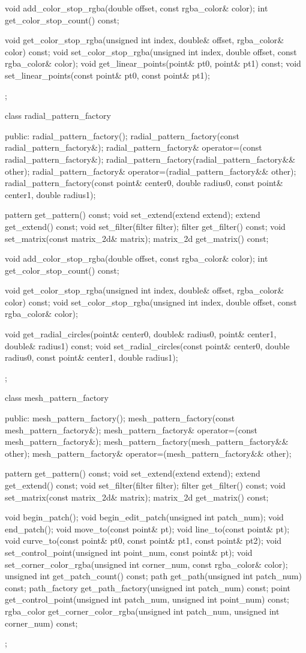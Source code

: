 \begin{codeblock}
{{{{{    void add_color_stop_rgba(double offset, const rgba_color& color);
    int get_color_stop_count() const;

    void get_color_stop_rgba(unsigned int index, double& offset, rgba_color& 
    color) const;
    void set_color_stop_rgba(unsigned int index, double offset, const 
    rgba_color& color);
    void get_linear_points(point& pt0, point& pt1) const;
    void set_linear_points(const point& pt0, const point& pt1);
  };

  class radial_pattern_factory {
  public:
    radial_pattern_factory();
    radial_pattern_factory(const radial_pattern_factory&);
    radial_pattern_factory& operator=(const radial_pattern_factory&);
    radial_pattern_factory(radial_pattern_factory&& other);
    radial_pattern_factory& operator=(radial_pattern_factory&& other);
    radial_pattern_factory(const point& center0, double radius0, const point& 
    center1, double radius1);

    pattern get_pattern() const;
    void set_extend(extend extend);
    extend get_extend() const;
    void set_filter(filter filter);
    filter get_filter() const;
    void set_matrix(const matrix_2d& matrix);
    matrix_2d get_matrix() const;

    void add_color_stop_rgba(double offset, const rgba_color& color);
    int get_color_stop_count() const;

    void get_color_stop_rgba(unsigned int index, double& offset, rgba_color& 
    color) const;
    void set_color_stop_rgba(unsigned int index, double offset, const 
    rgba_color& color);

    void get_radial_circles(point& center0, double& radius0, point& center1, 
    double& radius1) const;
    void set_radial_circles(const point& center0, double radius0, const point& 
    center1, double radius1);
  };

  class mesh_pattern_factory {
  public:
    mesh_pattern_factory();
    mesh_pattern_factory(const mesh_pattern_factory&);
    mesh_pattern_factory& operator=(const mesh_pattern_factory&);
    mesh_pattern_factory(mesh_pattern_factory&& other);
    mesh_pattern_factory& operator=(mesh_pattern_factory&& other);

    pattern get_pattern() const;
    void set_extend(extend extend);
    extend get_extend() const;
    void set_filter(filter filter);
    filter get_filter() const;
    void set_matrix(const matrix_2d& matrix);
    matrix_2d get_matrix() const;

    void begin_patch();
    void begin_edit_patch(unsigned int patch_num);
    void end_patch();
    void move_to(const point& pt);
    void line_to(const point& pt);
    void curve_to(const point& pt0, const point& pt1, const point& pt2);
    void set_control_point(unsigned int point_num, const point& pt);
    void set_corner_color_rgba(unsigned int corner_num, const rgba_color& 
    color);
    unsigned int get_patch_count() const;
    path get_path(unsigned int patch_num) const;
    path_factory get_path_factory(unsigned int patch_num) const;
    point get_control_point(unsigned int patch_num, unsigned int point_num) 
    const;
    rgba_color get_corner_color_rgba(unsigned int patch_num, unsigned int 
    corner_num) const;
  };

}}}}
\end{codeblock}
